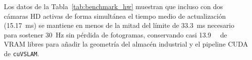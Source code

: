Los datos de la Tabla~\ref{tab:benchmark_hw} muestran que incluso con dos cámaras HD activas de forma simultánea el tiempo medio de actualización (\qty{15.17}{\milli\second}) se mantiene en menos de la mitad del límite de \qty{33.3}{\milli\second} necesario para sostener \qty{30}{\hertz} sin pérdida de fotogramas, conservando casi \qty{13.9}{\giga\byte} de VRAM libres para añadir la geometría del almacén industrial y el pipeline CUDA de \texttt{cuVSLAM}.

